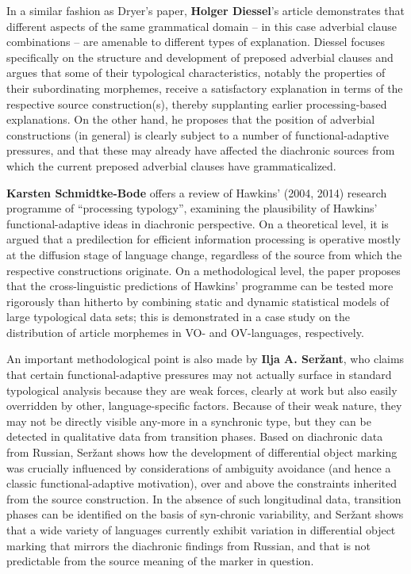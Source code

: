 \documentclass[output=paper]{langsci/langscibook}
\begin{document}
In a similar fashion as Dryer’s paper, \textbf{Holger Diessel}’s article demonstrates that different aspects of the same grammatical domain – in this case adverbial clause combinations – are amenable to different types of explanation. Diessel focuses specifically on the structure and development of preposed adverbial clauses and argues that some of their typological characteristics, notably the properties of their subordinating morphemes, receive a satisfactory explanation in terms of the respective source construction(s), thereby supplanting earlier processing-based explanations. On the other hand, he proposes that the position of adverbial constructions (in general) is clearly subject to a number of functional-adaptive pressures, and that these may already have affected the diachronic sources from which the current preposed adverbial clauses have grammaticalized.

\textbf{Karsten Schmidtke-Bode} offers a review of Hawkins’ (2004, 2014) research programme of “processing typology”, examining the plausibility of Hawkins’ functional-adaptive ideas in diachronic perspective. On a theoretical level, it is argued that a predilection for efficient information processing is operative mostly at the diffusion stage of language change, regardless of the source from which the respective constructions originate. On a methodological level, the paper proposes that the cross-linguistic predictions of Hawkins’ programme can be tested more rigorously than hitherto by combining static and dynamic statistical models of large typological data sets; this is demonstrated in a case study on the distribution of article morphemes in VO- and OV-languages, respectively.

An important methodological point is also made by \textbf{Ilja A. Seržant}, who claims that certain functional-adaptive pressures may not actually surface in standard typological analysis because they are weak forces, clearly at work but also easily overridden by other, language-specific factors. Because of their weak nature, they may not be directly visible any-more in a synchronic type, but they can be detected in qualitative data from transition phases. Based on diachronic data from Russian, Seržant shows how the development of differential object marking was crucially influenced by considerations of ambiguity avoidance (and hence a classic functional-adaptive motivation), over and above the constraints inherited from the source construction. In the absence of such longitudinal data, transition phases can be identified on the basis of syn-chronic variability, and Seržant shows that a wide variety of languages currently exhibit variation in differential object marking that mirrors the diachronic findings from Russian, and that is not predictable from the source meaning of the marker in question.
\end{document}
